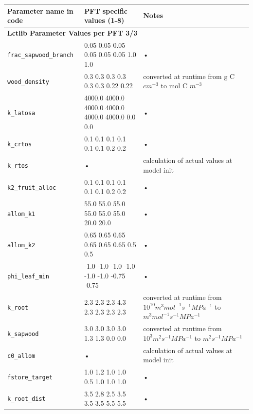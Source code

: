 \begin{table}
\begin{tabularx}{\linewidth}{|l|l|X|} %
\hline 
Parameter name in code & PFT specific values (1-8) & Notes \\ 
\hline 

\multicolumn{3}{l}{\bf Lctlib Parameter Values per PFT 3/3}\\
\hline
\texttt{frac\_sapwood\_branch} & 0.05 0.05 0.05 0.05 0.05 0.05 1.0 1.0 & • \\
\texttt{wood\_density} & 0.3 0.3 0.3 0.3 0.3 0.3 0.22 0.22 & converted at runtime from g C $cm^{-3}$ to mol C $m^{-3}$ \\
\texttt{k\_latosa} & 4000.0 4000.0 4000.0 4000.0 4000.0 4000.0 0.0 0.0 & • \\
\texttt{k\_crtos} & 0.1 0.1 0.1 0.1 0.1 0.1 0.2 0.2 & • \\
\texttt{k\_rtos} & • & calculation of actual values at model init \\
\texttt{k2\_fruit\_alloc} & 0.1 0.1 0.1 0.1 0.1 0.1 0.2 0.2 & • \\
\texttt{allom\_k1} & 55.0 55.0 55.0 55.0 55.0 55.0 20.0 20.0 & • \\
\texttt{allom\_k2} & 0.65 0.65 0.65 0.65 0.65 0.65 0.5 0.5 & • \\
\texttt{phi\_leaf\_min} & -1.0 -1.0 -1.0 -1.0 -1.0 -1.0 -0.75 -0.75 & • \\
\texttt{k\_root} & 2.3 2.3 2.3 4.3 2.3 2.3 2.3 2.3 & converted at runtime from $10^{10} m^3 mol^{-1} s^{-1} MPa^{-1}$ to $m^3 mol^{-1} s^{-1} MPa^{-1}$ \\
\texttt{k\_sapwood} & 3.0 3.0 3.0 3.0 1.3 1.3 0.0 0.0 & converted at runtime from $10^3 m^2 s^{-1} MPa^{-1}$ to $m^2 s^{-1} MPa^{-1}$ \\
\texttt{c0\_allom} & • & calculation of actual values at model init \\
\texttt{fstore\_target} & 1.0 1.2 1.0 1.0 0.5 1.0 1.0 1.0 & • \\
\texttt{k\_root\_dist} & 3.5 2.8 2.5 3.5 3.5 3.5 5.5 5.5 & • \\

\hline 
\end{tabularx}
\end{table}
